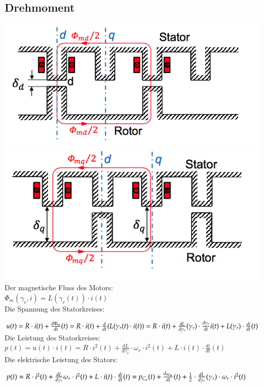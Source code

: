 \subsection{Drehmoment}
\begin{minipage}{0.5 \linewidth}
\includegraphics[width = 0.9\linewidth]{./Pics/VL67/Drehmoment}\\
\includegraphics[width = 0.9\linewidth]{./Pics/VL67/Drehmoment2} \\

Der magnetische Fluss des Motors: \\

$\Phi_m (\gamma_r,i) = L(\gamma_r(t)) \cdot i(t)$\\

Die Spannung des Statorkreises: 

$u(t)  = R \cdot i(t) + \frac{d\Phi_m}{dt}(t)  = R \cdot i(t) + \frac{d}{dt}(L(\gamma_r(t) \cdot i(t)) \\
 =  R \cdot i(t) + \frac{dL}{d\gamma_r}(\gamma_r) \cdot \frac{d\gamma_r}{dt}i(t) + L(\gamma_r) \cdot \frac{di}{dt}(t)$ \\
 
 Die Leistung des Statorkreises: \\
 
 $p(t) = u(t) \cdot i(t) = R \cdot i^2(t) + \frac{dL}{d\gamma_r} \cdot \omega_r \cdot i^2(t) + L \cdot i(t) \cdot \frac{di}{dt}(t)$\\
 
 Die elektrische Leistung des Stators: 
 
 $p(t) = R \cdot i^2(t) + \frac{dL}{d\gamma_r} \omega_r \cdot i^2(t) + L \cdot i(t) \cdot \frac{di}{dt}(t) \\ 
 = p_{C_u}(t) + \frac{d_{W_m}}{dt}(t) + \frac{1}{2} \cdot \frac{dL}{d \gamma_r}(\gamma_r) \cdot \omega_r \cdot i^2(t)$ \\
 
\end{minipage}

